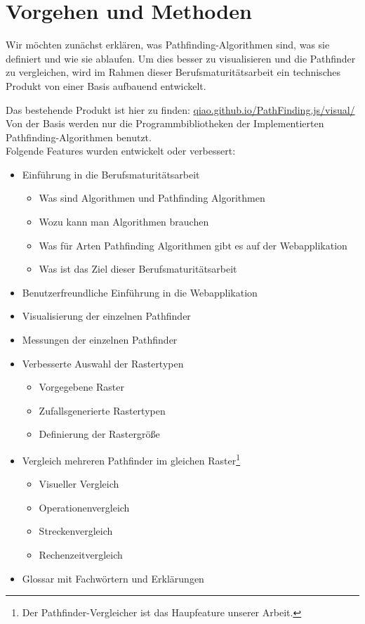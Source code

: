 \section{Vorgehen und Methoden}

Wir möchten zunächst erklären, was Pathfinding-Algorithmen sind, was sie definiert
und wie sie ablaufen. Um dies besser zu visualisieren und die Pathfinder
zu vergleichen, wird im Rahmen dieser Berufsmaturitätsarbeit ein
technisches Produkt von einer Basis aufbauend entwickelt.

Das bestehende Produkt ist hier zu finden: \url{qiao.github.io/PathFinding.js/visual/}\\
Von der Basis werden nur die Programmbibliotheken der Implementierten Pathfinding-Algorithmen benutzt.\\

Folgende Features wurden entwickelt oder verbessert:
\begin{itemize}
\item
  Einführung in die Berufsmaturitätsarbeit
  \begin{itemize}
  \item
    Was sind Algorithmen und Pathfinding Algorithmen
  \item
    Wozu kann man Algorithmen brauchen
  \item
    Was für Arten Pathfinding Algorithmen gibt es auf der Webapplikation
  \item
    Was ist das Ziel dieser Berufsmaturitätsarbeit
  \end{itemize}
\end{itemize}
\begin{itemize}
\item
  Benutzerfreundliche Einführung in die Webapplikation
\item
  Visualisierung der einzelnen Pathfinder
\item
  Messungen der einzelnen Pathfinder
\item
  Verbesserte Auswahl der Rastertypen
  \begin{itemize}
  \item
    Vorgegebene Raster
  \item
    Zufallsgenerierte Rastertypen
  \item
    Definierung der Rastergröße
  \end{itemize}
\item
  Vergleich mehreren Pathfinder im gleichen Raster\footnote{Der Pathfinder-Vergleicher ist das Haupfeature unserer Arbeit.}
  \begin{itemize}
  \item
    Visueller Vergleich
  \item
    Operationenvergleich
  \item
    Streckenvergleich
  \item
    Rechenzeitvergleich
  \end{itemize}
\end{itemize}
\begin{itemize}
\item
  Glossar mit Fachwörtern und Erklärungen
\end{itemize}

